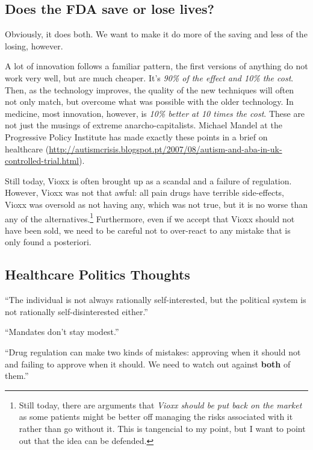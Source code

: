 \subsection{Does the FDA save or lose lives?}

Obviously, it does both. We want to make it do more of the saving and less of
the losing, however.

A lot of innovation follows a familiar pattern, the first versions of anything
do not work very well, but are much cheaper. It's \emph{90\% of the effect and
10\% the cost}. Then, as the technology improves, the quality of the new
techniques will often not only match, but overcome what was possible with the
older technology. In medicine, most innovation, however, is \emph{10\% better
at 10 times the cost}. These are not just the musings of extreme
anarcho-capitalists. Michael Mandel at the Progressive Policy Institute has
made exactly these points in a brief on healthcare
(\url{http://autismcrisis.blogspot.pt/2007/08/autism-and-aba-in-uk-controlled-trial.html}).

Still today, Vioxx is often brought up as a scandal and a failure of
regulation. However, Vioxx was not that awful: all pain drugs have terrible
side-effects, Vioxx was oversold as not having any, which was not true, but it
is no worse than any of the alternatives.\footnote{Still today, there are
arguments that \emph{Vioxx should be put back on the market} as some patients
might be better off managing the risks associated with it rather than go
without it. This is tangencial to my point, but I want to point out that the
idea can be defended.} Furthermore, even if we accept that Vioxx should not
have been sold, we need to be careful not to over-react to any mistake that is
only found a posteriori.

\subsection{Healthcare Politics Thoughts}

``The individual is not always rationally self-interested, but the political
system is not rationally self-disinterested either.''

``Mandates don't stay modest.''

``Drug regulation can make two kinds of mistakes: approving when it should not
and failing to approve when it should. We need to watch out against
\textbf{both} of them.''


